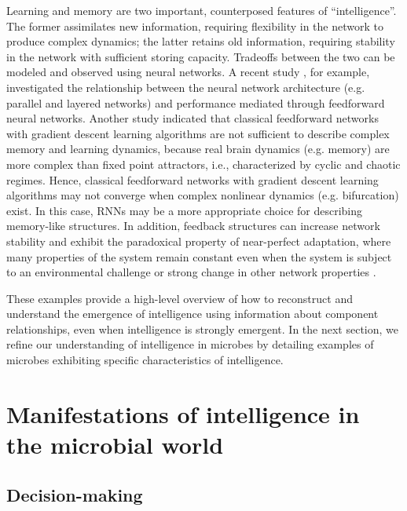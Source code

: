 Learning and memory are two important, counterposed features of ``intelligence''. The former assimilates new information, requiring flexibility in the network to produce complex dynamics; the latter retains old information, requiring stability in the network with sufficient storing capacity. Tradeoffs between the two can be modeled and observed using neural networks. A recent study \cite{hermundstad_learning_2011}, for example, investigated the relationship between the neural network architecture (e.g. parallel and layered networks) and performance mediated through feedforward neural networks. Another study indicated that classical feedforward networks with gradient descent learning algorithms are not sufficient to describe complex memory and learning dynamics, because real brain dynamics (e.g. memory) are more complex than fixed point attractors, i.e., characterized by cyclic and chaotic regimes. Hence, classical feedforward networks with gradient descent learning algorithms may not converge when complex nonlinear dynamics (e.g. bifurcation) exist. In this case, RNNs may be a more appropriate choice for describing memory-like structures. In addition, feedback structures can increase network stability and exhibit the paradoxical property of near-perfect adaptation, where many properties of the system remain constant even when the system is subject to an environmental challenge or strong change in other network properties \cite{he_imperfect_2013}. 

These examples provide a high-level overview of how to reconstruct and understand the emergence of intelligence using information about component relationships, even when intelligence is strongly emergent. In the next section, we refine our understanding of intelligence in microbes by detailing examples of microbes exhibiting specific characteristics of intelligence.

\section{Manifestations of intelligence in the microbial world}

\subsection{Decision-making}

